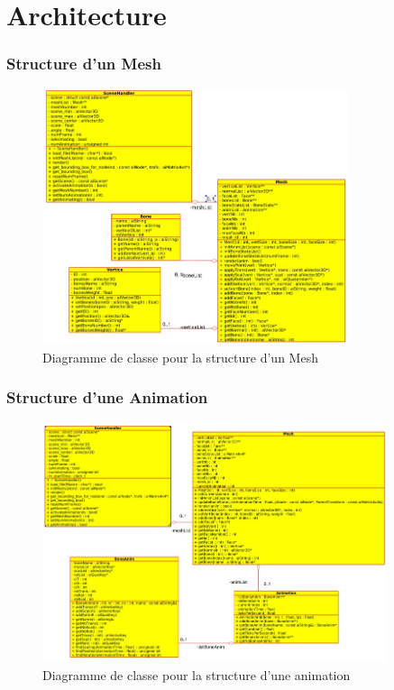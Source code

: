 \documentclass[10pt]{beamer}
\begin{document}
\section{Architecture}
\begin{frame}
\frametitle{Structure d'un Mesh}
\begin{figure}[H]
    \begin{center}
        \includegraphics[width=0.8\textwidth]{MeshStructure.jpg}
        \caption{Diagramme de classe pour la structure d'un Mesh}
    \end{center}
\end{figure}
\end{frame}

\begin{frame}
\frametitle{Structure d'une Animation}
\begin{figure}[H]
    \begin{center}
        \includegraphics[width=0.9\textwidth]{AnimStructure.jpg}
        \caption{Diagramme de classe pour la structure d'une animation}
    \end{center}
\end{figure}
\end{frame}
\end{document}
